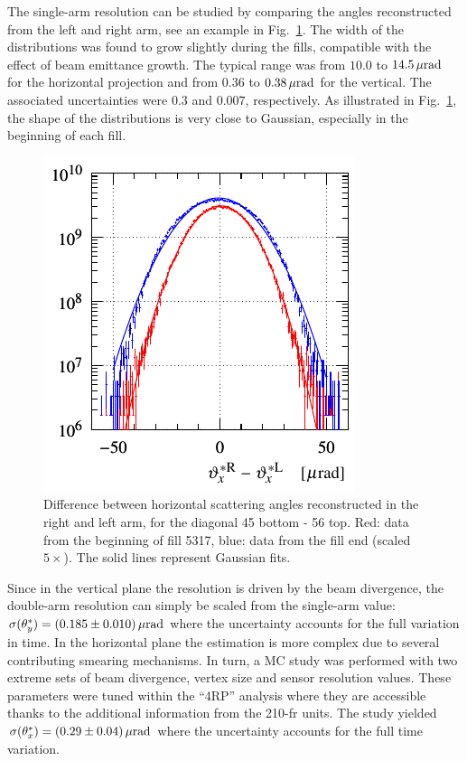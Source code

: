 The single-arm resolution can be studied by comparing the angles reconstructed from the left and right arm, see an example in Fig.~\ref{fig:resol x 1a}. The width of the distributions was found to grow slightly during the fills, compatible with the effect of beam emittance growth. The typical range was from $10.0$ to $14.5\,{\rm \mu rad}$ for the horizontal projection and from $0.36$ to $0.38\,{\rm \mu rad}$ for the vertical. The associated uncertainties were $0.3$ and $0.007$, respectively. As illustrated in Fig.~\ref{fig:resol x 1a}, the shape of the distributions is very close to Gaussian, especially in the beginning of each fill.

\begin{figure}
\begin{center}
\includegraphics{fig/resolution_non_gaussianity.pdf}
\caption{%
Difference between horizontal scattering angles reconstructed in the right and left arm, for the diagonal 45 bottom - 56 top. Red: data from the beginning of fill 5317, blue: data from the fill end (scaled $5\times$). The solid lines represent Gaussian fits.
}
\label{fig:resol x 1a}
\end{center}
\end{figure}

Since in the vertical plane the resolution is driven by the beam divergence, the double-arm resolution can simply be scaled from the single-arm value: $\sigma(\theta^*_y) = (0.185 \pm 0.010)\,{\rm \mu rad}$ where the uncertainty accounts for the full variation in time. In the horizontal plane the estimation is more complex due to several contributing smearing mechanisms. In turn, a MC study was performed with two extreme sets of beam divergence, vertex size and sensor resolution values. These parameters were tuned within the ``4RP'' analysis where they are accessible thanks to the additional information from the 210-fr units. The study yielded $\sigma(\theta^*_x) =  (0.29 \pm 0.04)\,{\rm \mu rad}$ where the uncertainty accounts for the full time variation.


